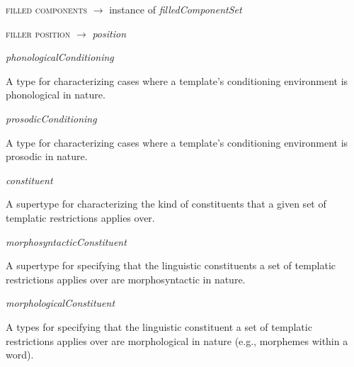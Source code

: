 \begin{ontologytop}
\begin{classlist}
\begin{classlist}
			\begin{proplist}

			\item \textsc{filled components} $\rightarrow$ instance of \emph{filledComponentSet}

			\item \textsc{filler position} $\rightarrow$  \emph{position}

			\end{proplist}

		\end{classlist}

	\item \emph{phonologicalConditioning}
	\hspace{1em}\parbox[t]{\linegoal}{\footnotesize A type for characterizing cases where a template's conditioning environment is phonological in nature.}


		\begin{classlist}

		\item \emph{prosodicConditioning}
		\hspace{1em}\parbox[t]{\linegoal}{\footnotesize A type for characterizing cases where a template's conditioning environment is prosodic in nature.}


		\end{classlist}

	\end{classlist}

\item \emph{constituent}
\hspace{1em}\parbox[t]{\linegoal}{\footnotesize A supertype for characterizing the kind of constituents that a given set of templatic restrictions applies over.}


	\begin{classlist}

	\item \emph{morphosyntacticConstituent}
	\hspace{1em}\parbox[t]{\linegoal}{\footnotesize A supertype for specifying that the linguistic constituents a set of templatic restrictions applies over are morphosyntactic in nature.}


		\begin{classlist}

		\item \emph{morphologicalConstituent}
		\hspace{1em}\parbox[t]{\linegoal}{\footnotesize A types for specifying that the linguistic constituent a set of templatic restrictions applies over are morphological in nature (e.g., morphemes within a word).}



\end{classlist}
\end{classlist}
\end{ontologytop}
